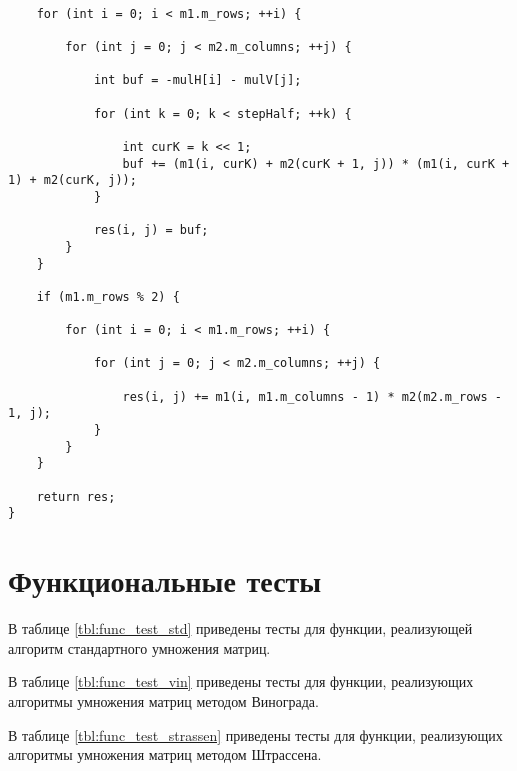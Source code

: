 \clearpage

\begin{lstlisting}[label=lst:vin_opt_2, caption=Функция умножения матриц оптимизированным методом Винограда (часть 2)]

    for (int i = 0; i < m1.m_rows; ++i) {

        for (int j = 0; j < m2.m_columns; ++j) {

            int buf = -mulH[i] - mulV[j];

            for (int k = 0; k < stepHalf; ++k) {

                int curK = k << 1;
                buf += (m1(i, curK) + m2(curK + 1, j)) * (m1(i, curK + 1) + m2(curK, j));
            }

            res(i, j) = buf;
        }
    }

    if (m1.m_rows % 2) {

        for (int i = 0; i < m1.m_rows; ++i) {

            for (int j = 0; j < m2.m_columns; ++j) { 

                res(i, j) += m1(i, m1.m_columns - 1) * m2(m2.m_rows - 1, j);
            }
        }
    }

    return res;
} 
\end{lstlisting}

\section{Функциональные тесты}
В таблице \ref{tbl:func_test_std} приведены тесты для функции, реализующей алгоритм стандартного умножения матриц.

В таблице \ref{tbl:func_test_vin} приведены тесты для функции, реализующих алгоритмы умножения матриц методом Винограда.

В таблице \ref{tbl:func_test_strassen} приведены тесты для функции, реализующих алгоритмы умножения матриц методом Штрассена.

